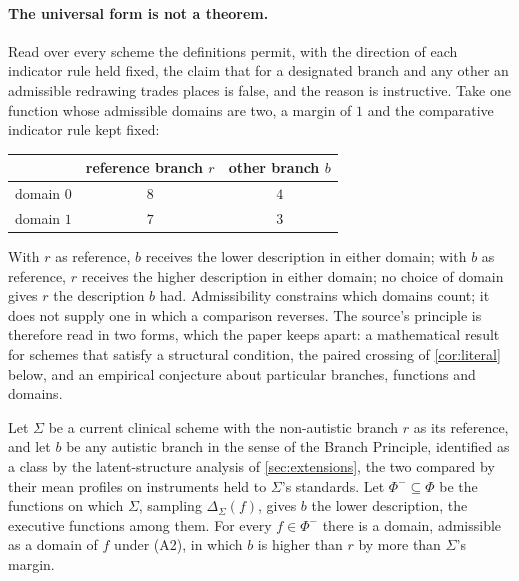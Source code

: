 \paragraph{The universal form is not a theorem.} Read over every scheme the definitions permit, with the direction of each indicator rule held fixed, the claim that for a designated branch and any other an admissible redrawing trades places is false, and the reason is instructive. Take one function whose admissible domains are two, a margin of $1$ and the comparative indicator rule kept fixed:
\begin{center}
\small
\begin{tabular}{@{}lcc@{}}
\toprule
& reference branch $r$ & other branch $b$ \\
\midrule
domain $0$ & $8$ & $4$ \\
domain $1$ & $7$ & $3$ \\
\bottomrule
\end{tabular}
\end{center}
With $r$ as reference, $b$ receives the lower description in either domain; with $b$ as reference, $r$ receives the higher description in either domain; no choice of domain gives $r$ the description $b$ had. Admissibility constrains which domains count; it does not supply one in which a comparison reverses. The source's principle is therefore read in two forms, which the paper keeps apart: a mathematical result for schemes that satisfy a structural condition, the paired crossing of \autoref{cor:literal} below, and an empirical conjecture about particular branches, functions and domains.

\begin{conjecture}
\label{conj:scheme-symmetry}
Let $\Sigma$ be a current clinical scheme with the non-autistic branch $r$ as its reference, and let $b$ be any autistic branch in the sense of the Branch Principle, identified as a class by the latent-structure analysis of \autoref{sec:extensions}, the two compared by their mean profiles on instruments held to $\Sigma$'s standards. Let $\Phi^{-} \subseteq \Phi$ be the functions on which $\Sigma$, sampling $\Delta_\Sigma(f)$, gives $b$ the lower description, the executive functions among them. For every $f \in \Phi^{-}$ there is a domain, admissible as a domain of $f$ under (A2), in which $b$ is higher than $r$ by more than $\Sigma$'s margin.
\end{conjecture}

